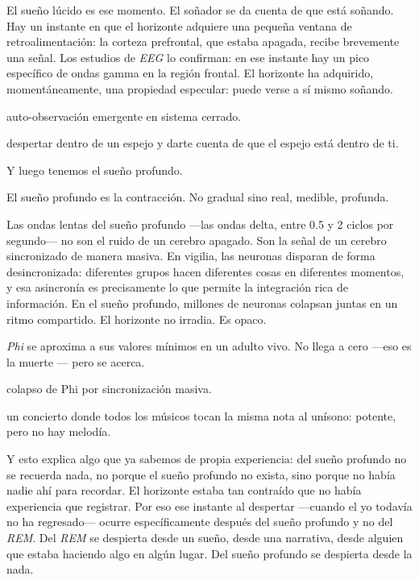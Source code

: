 El sueño lúcido es ese momento. El soñador se da cuenta de que está soñando. Hay un instante en que el horizonte adquiere una pequeña ventana de retroalimentación: la corteza prefrontal, que estaba apagada, recibe brevemente una señal. Los estudios de \emph{EEG} lo confirman: en ese instante hay un pico específico de ondas gamma en la región frontal. El horizonte ha adquirido, momentáneamente, una propiedad especular: puede verse a sí mismo soñando.

\begin{fisica}
 auto-observación emergente en sistema cerrado.

 despertar dentro de un espejo y darte cuenta de que el espejo está dentro de ti.
\end{fisica}
\noindent Y luego tenemos el sueño profundo.

El sueño profundo es la contracción. No gradual sino real, medible, profunda.

Las ondas lentas del sueño profundo —las ondas delta, entre 0.5 y 2 ciclos por segundo— no son el ruido de un cerebro apagado. Son la señal de un cerebro sincronizado de manera masiva. En vigilia, las neuronas disparan de forma desincronizada: diferentes grupos hacen diferentes cosas en diferentes momentos, y esa asincronía es precisamente lo que permite la integración rica de información. En el sueño profundo, millones de neuronas colapsan juntas en un ritmo compartido. El horizonte no irradia. Es opaco.

\emph{Phi} se aproxima a sus valores mínimos en un adulto vivo. No llega a cero —eso es la muerte — pero se acerca.

\begin{fisica}
 colapso de Phi por sincronización masiva.

 un concierto donde todos los músicos tocan la misma nota al unísono: potente, pero no hay melodía.
\end{fisica}
Y esto explica algo que ya sabemos de propia experiencia: del sueño profundo no se recuerda nada, no porque el sueño profundo no exista, sino porque no había nadie ahí para recordar. El horizonte estaba tan contraído que no había experiencia que registrar. Por eso ese instante al despertar —cuando el yo todavía no ha regresado— ocurre específicamente después del sueño profundo y no del \emph{REM}. Del \emph{REM} se despierta desde un sueño, desde una narrativa, desde alguien que estaba haciendo algo en algún lugar. Del sueño profundo se despierta desde la nada.

